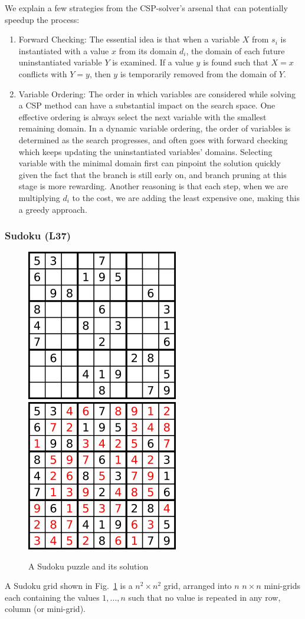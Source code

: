 \documentclass[../main.tex]{subfiles}
\begin{document}
We explain a few strategies from the CSP-solver's arsenal that can potentially speedup the process:
\begin{enumerate}
    \item Forward Checking: The essential idea is that when a variable $X$ from $s_i$ is instantiated with a value $x$ from its domain $d_i$, the domain of each future uninstantiated variable $Y$ is examined. If a value $y$ is found such that $X=x$ conflicts with $Y=y$, then $y$ is temporarily removed from the domain of $Y$. 
    \item Variable Ordering: The order in which variables are considered while solving a CSP method can have a substantial impact on the search space. One effective ordering is always select the next variable with the smallest remaining domain. In a dynamic variable ordering, the order of variables is determined as the search progresses, and often goes with forward checking which keeps updating the uninstantiated variables' domains. Selecting variable with the minimal domain first can pinpoint the solution quickly given the fact that the branch is still early on, and branch pruning at this stage is more rewarding. Another reasoning is that each step, when we are multiplying $d_i$ to the cost, we are adding the least expensive one, making this a greedy approach. 
\end{enumerate}
\subsubsection{Sudoku (L37)} 
\begin{figure}[!ht]
    \centering
    \includegraphics[width= 0.35\columnwidth]{fig/250px-Sudoku-by-L2G-20050714.png}
    \includegraphics[width= 0.35\columnwidth]{fig/250px-Sudoku-by-L2G-20050714_solution.png}
    \caption{A Sudoku puzzle and its solution}
    \label{fig:backtrack_puzzle_2}
\end{figure}
A Sudoku grid shown in Fig.~\ref{fig:backtrack_puzzle_2} is a $n^2\times n^2$ grid, arranged into $n$ $n\times n$ mini-grids each containing the values $1,...,n$ such that no value is repeated in any row, column (or mini-grid).  
\end{document}
